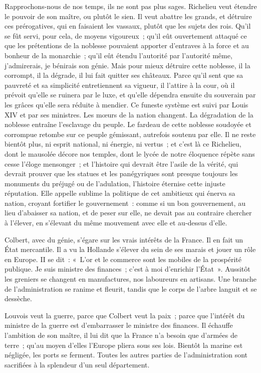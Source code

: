 \documentclass[french,twoside]{book} %
\begin{document}
Rapprochons-nous de nos temps, ils ne sont pas plus sages. Richelieu veut étendre le pouvoir de son maître, ou plutôt le sien. Il veut abattre les grands, et détruire ces prérogatives, qui en faisaient les vassaux, plutôt que les sujets des rois. Qu’il se fût servi, pour cela, de moyens vigoureux ; qu’il eût ouvertement attaqué ce que les prétentions de la noblesse pouvaient apporter d’entraves à la force et au bonheur de la monarchie ; qu’il eût étendu l’autorité par l’autorité même, j’admirerais, je bénirais son génie. Mais pour mieux détruire cette noblesse, il la corrompt, il la dégrade, il lui fait quitter ses châteaux. Parce qu’il sent que sa pauvreté et sa simplicité entretiennent sa vigueur, il l’attire à la cour, où il prévoit qu’elle se ruinera par le luxe, et qu’elle dépendra ensuite du souverain par les grâces qu’elle sera réduite à mendier. Ce funeste système est suivi par Louis XIV et par ses ministres. Les mœurs de la nation changent. La dégradation de la noblesse entraîne l’esclavage du peuple. Le fardeau de cette noblesse soudoyée et corrompue retombe sur ce peuple gémissant, autrefois soutenu par elle. Il ne reste bientôt plus, ni esprit national, ni énergie, ni vertus ; et c’est là ce Richelieu, dont le mausolée décore nos temples, dont le lycée de notre éloquence répète sans cesse l’éloge mensonger ; et l’histoire qui devrait être l’asile de la vérité, qui devrait prouver que les statues et les panégyriques sont presque toujours les monuments du préjugé ou de l’adulation, l’histoire éternise cette injuste réputation. Elle appelle sublime la politique de cet ambitieux qui énerva sa nation, croyant fortifier le gouvernement : comme si un bon gouvernement, au lieu d’abaisser sa nation, et de peser sur elle, ne devait pas au contraire chercher à l’élever, en s’élevant du même mouvement avec elle et au-dessus d’elle.\par
Colbert, avec du génie, s’égare sur les vrais intérêts de la France. Il en fait un État mercantile. Il a vu la Hollande s’élever du sein de ses marais et jouer un rôle en Europe. II se dit : « L’or et le commerce sont les mobiles de la prospérité publique. Je suis ministre des finances ; c’est à moi d’enrichir l’État ». Aussitôt les greniers se changent en manufactures, nos laboureurs en artisans. Une branche de l’administration se ranime et fleurit, tandis que le corps de l’arbre languit et se dessèche.\par
Louvois veut la guerre, parce que Colbert veut la paix ; parce que l’intérêt du ministre de la guerre est d’embarrasser le ministre des finances. Il échauffe l’ambition de son maître, il lui dit que la France n’a besoin que d’armées de terre ; qu’au moyen d’elles l’Europe pliera sous ses lois. Bientôt la marine est négligée, les ports se ferment. Toutes les autres parties de l’administration sont sacrifiées à la splendeur d’un seul département.\par
\end{document}
